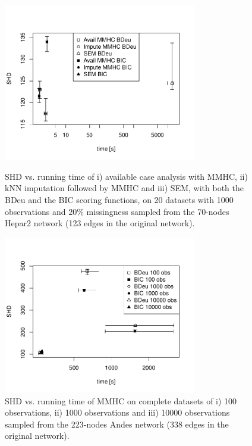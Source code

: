 \documentclass{article}\usepackage[]{graphicx}\usepackage[]{color}
\begin{document}
\begin{figure}[!tpb]%
\centerline{\includegraphics[width=0.75\textwidth]{hepar2_crosses_1000.pdf}}
\caption{SHD vs. running time of i) available case analysis with MMHC, ii) kNN imputation followed by MMHC and iii) SEM, with both the BDeu and the BIC scoring functions, on 20 datasets with 1000 observations and $20\%$ missingness sampled from the 70-nodes Hepar2 network (123 edges in the original network).}\label{fig:hepar2crosses}

\centerline{\includegraphics[width=0.75\textwidth]{andes_crosses.pdf}}
\caption{SHD vs. running time of MMHC on complete datasets of i) 100 observations, ii) 1000 observations and iii) 10000 observations sampled from the 223-nodes Andes network (338 edges in the original network).}\label{fig:andescrosses}
\end{figure}
\end{document}
